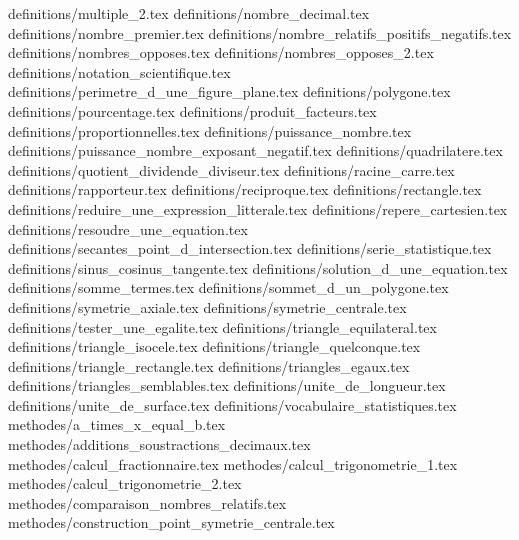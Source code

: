 \catalogues@enonce definitions/multiple_2.tex
\catalogues@enonce definitions/nombre_decimal.tex
\catalogues@enonce definitions/nombre_premier.tex
\catalogues@enonce definitions/nombre_relatifs_positifs_negatifs.tex
\catalogues@enonce definitions/nombres_opposes.tex
\catalogues@enonce definitions/nombres_opposes_2.tex
\catalogues@enonce definitions/notation_scientifique.tex
\catalogues@enonce definitions/perimetre_d_une_figure_plane.tex
\catalogues@enonce definitions/polygone.tex
\catalogues@enonce definitions/pourcentage.tex
\catalogues@enonce definitions/produit_facteurs.tex
\catalogues@enonce definitions/proportionnelles.tex
\catalogues@enonce definitions/puissance_nombre.tex
\catalogues@enonce definitions/puissance_nombre_exposant_negatif.tex
\catalogues@enonce definitions/quadrilatere.tex
\catalogues@enonce definitions/quotient_dividende_diviseur.tex
\catalogues@enonce definitions/racine_carre.tex
\catalogues@enonce definitions/rapporteur.tex
\catalogues@enonce definitions/reciproque.tex
\catalogues@enonce definitions/rectangle.tex
\catalogues@enonce definitions/reduire_une_expression_litterale.tex
\catalogues@enonce definitions/repere_cartesien.tex
\catalogues@enonce definitions/resoudre_une_equation.tex
\catalogues@enonce definitions/secantes_point_d_intersection.tex
\catalogues@enonce definitions/serie_statistique.tex
\catalogues@enonce definitions/sinus_cosinus_tangente.tex
\catalogues@enonce definitions/solution_d_une_equation.tex
\catalogues@enonce definitions/somme_termes.tex
\catalogues@enonce definitions/sommet_d_un_polygone.tex
\catalogues@enonce definitions/symetrie_axiale.tex
\catalogues@enonce definitions/symetrie_centrale.tex
\catalogues@enonce definitions/tester_une_egalite.tex
\catalogues@enonce definitions/triangle_equilateral.tex
\catalogues@enonce definitions/triangle_isocele.tex
\catalogues@enonce definitions/triangle_quelconque.tex
\catalogues@enonce definitions/triangle_rectangle.tex
\catalogues@enonce definitions/triangles_egaux.tex
\catalogues@enonce definitions/triangles_semblables.tex
\catalogues@enonce definitions/unite_de_longueur.tex
\catalogues@enonce definitions/unite_de_surface.tex
\catalogues@enonce definitions/vocabulaire_statistiques.tex
\catalogues@enonce methodes/a_times_x_equal_b.tex
\catalogues@enonce methodes/additions_soustractions_decimaux.tex
\catalogues@enonce methodes/calcul_fractionnaire.tex
\catalogues@enonce methodes/calcul_trigonometrie_1.tex
\catalogues@enonce methodes/calcul_trigonometrie_2.tex
\catalogues@enonce methodes/comparaison_nombres_relatifs.tex
\catalogues@enonce methodes/construction_point_symetrie_centrale.tex
